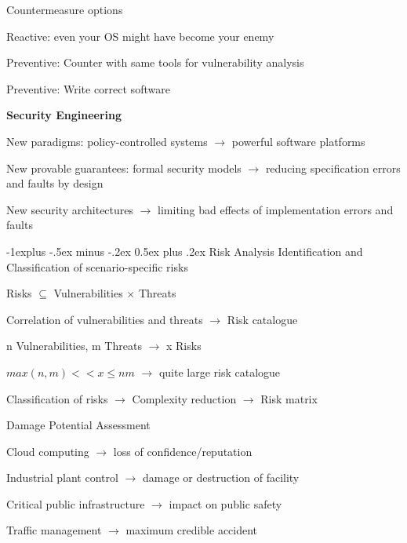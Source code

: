 \documentclass[a4paper]{article}
\makeatletter
\renewcommand{\note}[2]{\begin{noteBox} \textbf{#1} #2 \end{noteBox}}
\renewcommand{\subsection}{\@startsection{subsection}{2}{0mm}%
                {-1explus -.5ex minus -.2ex}%
                {0.5ex plus .2ex}%
                {\normalfont\normalsize\bfseries}}
\makeatother
\begin{document}
\begin{multicols}{3}
    Countermeasure options
    \begin{itemize*}
        \item Reactive: even your OS might have become your enemy
        \item Preventive: Counter with same tools for vulnerability analysis
        \item Preventive: Write correct software
    \end{itemize*}

    \note{Security Engineering}{
        \begin{itemize*}
            \item New paradigms: policy-controlled systems $\rightarrow$ powerful software platforms
            \item New provable guarantees: formal security models $\rightarrow$ reducing specification errors and faults by design
            \item New security architectures $\rightarrow$ limiting bad effects of implementation errors and faults
        \end{itemize*}
    }

    \subsection{Risk Analysis}
    Identification and Classification of scenario-specific risks
    \begin{itemize*}
        \item Risks $\subseteq$ Vulnerabilities $\times$ Threats
        \item Correlation of vulnerabilities and threats $\rightarrow$ Risk catalogue
        \item n Vulnerabilities, m Threats $\rightarrow$ x Risks
        \item $max(n,m)<< x \leq nm$ $\rightarrow$ quite large risk catalogue
        \item Classification of risks $\rightarrow$ Complexity reduction $\rightarrow$ Risk matrix
    \end{itemize*}

    Damage Potential Assessment
    \begin{itemize*}
        \item Cloud computing $\rightarrow$ loss of confidence/reputation
        \item Industrial plant control $\rightarrow$ damage or destruction of facility
        \item Critical public infrastructure $\rightarrow$ impact on public safety
        \item Traffic management $\rightarrow$ maximum credible accident
    \end{itemize*}


\end{multicols}
\end{document}
